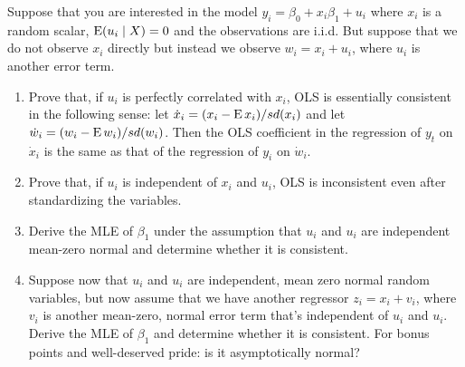 

\begin{hw}
  Suppose that you are interested in the model $y_i = \beta_0 +
  x_i\beta_1 + u_i$ where $x_i$ is a random scalar, $\operatorname{E}(u_i \mid X) =
  0$ and the observations are i.i.d. But suppose that we do not
  observe $x_i$ directly but instead we observe $w_i = x_i + u_i$,
  where $u_i$ is another error term.
  \begin{enumerate}
  \item Prove that, if $u_i$ is perfectly correlated with $x_i$, OLS
    is essentially consistent in the following sense: let $\dot x_i =
    (x_i - \operatorname{E} x_i) / sd(x_i)$ and let $\dot w_i = (w_i - \operatorname{E} w_i) /
    sd(w_i)$. Then the OLS coefficient in the regression of $y_t$ on
    $\dot x_i$ is the same as that of the regression of $y_i$ on $\dot
    w_i$.
  \item Prove that, if $u_i$ is independent of $x_i$ and $u_i$, OLS is
    inconsistent even after standardizing the variables.
  \item Derive the MLE of $\beta_1$ under the assumption that $u_i$ and
    $u_i$ are independent mean-zero normal and determine whether it is
    consistent.
  \item Suppose now that $u_i$ and $u_i$ are independent, mean zero
    normal random variables, but now assume that we have another
    regressor $z_i = x_i + v_i$, where $v_i$ is another mean-zero,
    normal error term that's independent of $u_i$ and $u_i$. Derive
    the MLE of $\beta_1$ and determine whether it is consistent. For bonus
    points and well-deserved pride: is it asymptotically normal?
  \end{enumerate}
\end{hw}


